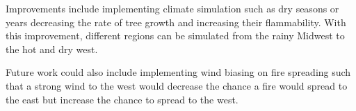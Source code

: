\documentclass[ aps, pra, reprint, notitlepage ]{revtex4-1}
\begin{document}
Improvements include implementing climate simulation such as dry seasons or years decreasing the rate of tree growth and increasing their flammability. With this improvement, different regions can be simulated from the rainy Midwest to the hot and dry west.

Future work could also include implementing wind biasing on fire spreading such that a strong wind to the west would decrease the chance a fire would spread to the east but increase the chance to spread to the west.



%


\end{document}

